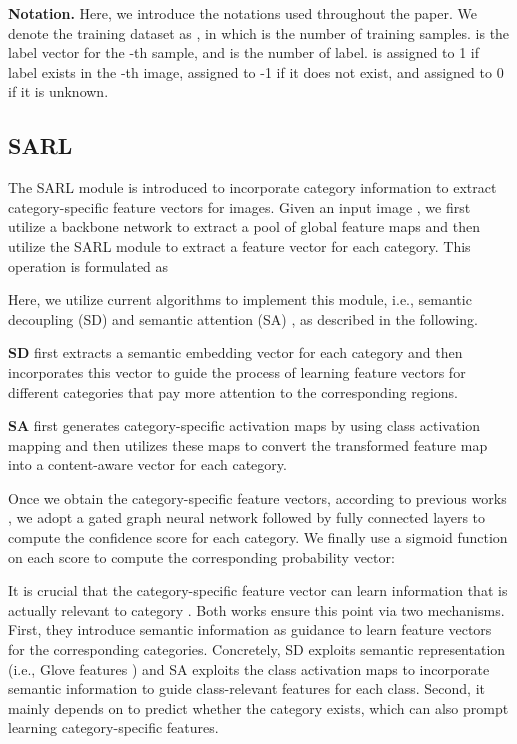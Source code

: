\noindent\textbf{Notation. }Here, we introduce the notations used throughout the paper. We denote the training dataset as , in which  is the number of training samples.  is the label vector for the -th sample, and  is the number of label.  is assigned to 1 if label  exists in the -th image, assigned to -1 if it does not exist, and assigned to 0 if it is unknown.

\subsection{SARL}
\label{sec:sarl}
The SARL module is introduced to incorporate category information to extract category-specific feature vectors for images. Given an input image , we first utilize a backbone network to extract a pool of global feature maps  and then utilize the SARL module to extract a feature vector for each category. This operation is formulated as

Here, we utilize current algorithms to implement this module, i.e., semantic decoupling (SD) \cite{chen2019learning} and semantic attention (SA) \cite{Ye2020ADD-GCN}, as described in the following.

\noindent\textbf{SD} first extracts a semantic embedding vector for each category and then incorporates this vector to guide the process of learning feature vectors for different categories that pay more attention to the corresponding regions.

\noindent\textbf{SA} first generates category-specific activation maps by using class activation mapping \cite{Zhou2016CAM} and then utilizes these maps to convert the transformed feature map into a content-aware vector for each category.

\noindent Once we obtain the category-specific feature vectors, according to previous works \cite{chen2019learning,Ye2020ADD-GCN}, we adopt a gated graph neural network followed by fully connected layers to compute the confidence score for each category. We finally use a sigmoid function on each score to compute the corresponding probability vector:


It is crucial that the category-specific feature vector  can learn information that is actually relevant to category . Both works \cite{chen2019learning,Ye2020ADD-GCN} ensure this point via two mechanisms. First, they introduce semantic information as guidance to learn feature vectors for the corresponding categories. Concretely, SD \cite{chen2019learning} exploits semantic representation (i.e., Glove features \cite{pennington2014glove}) and SA \cite{Ye2020ADD-GCN} exploits the class activation maps to incorporate semantic information to guide class-relevant features for each class. Second, it mainly depends on  to predict whether the category  exists, which can also prompt learning category-specific features.


